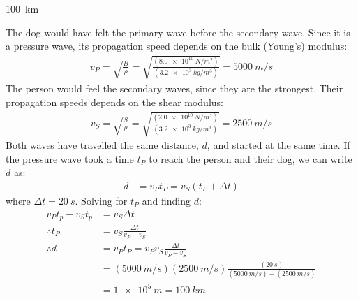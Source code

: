 \begin{finalanswer}
\SI{100}{km}
\end{finalanswer}
\begin{solution}
The dog would have felt the primary wave before the secondary wave. Since it is a pressure wave, its propagation speed depends on the bulk (Young's) modulus:
\begin{align*}
v_P=\sqrt{\frac{B}{\rho}}=\sqrt{\frac{(\SI{8.0e10}{N/m^2})}{(\SI{3.2e3}{kg/m^3})}}=\SI{5000}{m/s}
\end{align*} 
The person would feel the secondary waves, since they are the strongest. Their propagation speeds depends on the shear modulus:
\begin{align*}
v_S=\sqrt{\frac{S}{\rho}}=\sqrt{\frac{(\SI{2.0e10}{N/m^2})}{(\SI{3.2e3}{kg/m^3})}}=\SI{2500}{m/s}
\end{align*}
Both waves have travelled the same distance, $d$, and started at the same time. If the pressure wave took a time $t_P$ to reach the person and their dog, we can write $d$ as:
\begin{align*}
d &= v_Pt_P=v_S(t_P+\Delta t)
\end{align*}
where $\Delta t=\SI{20}{s}$. Solving for $t_P$ and finding $d$:
\begin{align*}
v_Pt_p-v_St_p&=v_S\Delta t\\
\therefore t_P &= v_S\frac{\Delta t}{v_P-v_S}\\
\therefore d &=  v_Pt_P = v_Pv_S\frac{\Delta t}{v_P-v_S}\\
&=(\SI{5000}{m/s})(\SI{2500}{m/s})\frac{(\SI{20}{s})}{(\SI{5000}{m/s})-(\SI{2500}{m/s})}\\
&=\SI{1e5}{m}=\SI{100}{km}
\end{align*}
\end{solution}

